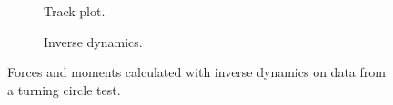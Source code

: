 \begin{figure}[h]
     \centering
     \begin{subfigure}[b]{0.49\textwidth}
         \centering
         
        \caption{Track plot.}
        \label{fig:sim_optiwise_10_port}
     \end{subfigure}
     \hfill
     \begin{subfigure}[b]{0.49\textwidth}
         
        \caption{Inverse dynamics.}
        \label{fig:sim_optiwise_10_stbd}
     \end{subfigure}
    \caption{Forces and moments calculated with inverse dynamics on data from a turning circle test.}
    \label{fig:ID}
\end{figure}